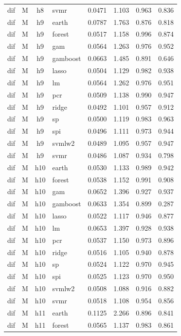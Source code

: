 \begin{ThreePartTable}
\begin{longtable}[t]{llclcccc}
dif & M & h8 & svmr & 0.0471 & 1.103 & 0.963 & 0.836\\
\addlinespace
dif & M & h9 & earth & 0.0787 & 1.763 & 0.876 & 0.818\\
dif & M & h9 & forest & 0.0517 & 1.158 & 0.996 & 0.874\\
dif & M & h9 & gam & 0.0564 & 1.263 & 0.976 & 0.952\\
dif & M & h9 & gamboost & 0.0663 & 1.485 & 0.891 & 0.646\\
dif & M & h9 & lasso & 0.0504 & 1.129 & 0.982 & 0.938\\
dif & M & h9 & lm & 0.0564 & 1.262 & 0.976 & 0.951\\
dif & M & h9 & pcr & 0.0509 & 1.138 & 0.990 & 0.947\\
dif & M & h9 & ridge & 0.0492 & 1.101 & 0.957 & 0.912\\
dif & M & h9 & sp & 0.0500 & 1.119 & 0.983 & 0.963\\
dif & M & h9 & spi & 0.0496 & 1.111 & 0.973 & 0.944\\
dif & M & h9 & svmlw2 & 0.0489 & 1.095 & 0.957 & 0.947\\
dif & M & h9 & svmr & 0.0486 & 1.087 & 0.934 & 0.798\\
\addlinespace
dif & M & h10 & earth & 0.0530 & 1.133 & 0.989 & 0.942\\
dif & M & h10 & forest & 0.0538 & 1.152 & 0.991 & 0.908\\
dif & M & h10 & gam & 0.0652 & 1.396 & 0.927 & 0.937\\
dif & M & h10 & gamboost & 0.0633 & 1.354 & 0.899 & 0.287\\
dif & M & h10 & lasso & 0.0522 & 1.117 & 0.946 & 0.877\\
dif & M & h10 & lm & 0.0653 & 1.397 & 0.928 & 0.938\\
dif & M & h10 & pcr & 0.0537 & 1.150 & 0.973 & 0.896\\
dif & M & h10 & ridge & 0.0516 & 1.105 & 0.940 & 0.878\\
dif & M & h10 & sp & 0.0524 & 1.122 & 0.970 & 0.945\\
dif & M & h10 & spi & 0.0525 & 1.123 & 0.970 & 0.950\\
dif & M & h10 & svmlw2 & 0.0508 & 1.088 & 0.916 & 0.882\\
dif & M & h10 & svmr & 0.0518 & 1.108 & 0.954 & 0.856\\
\addlinespace
dif & M & h11 & earth & 0.1125 & 2.266 & 0.896 & 0.841\\
dif & M & h11 & forest & 0.0565 & 1.137 & 0.983 & 0.861\\

\end{longtable}
\end{ThreePartTable}
